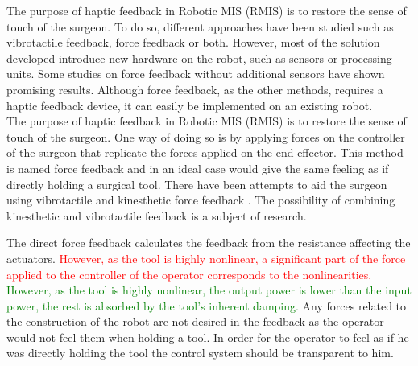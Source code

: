 {\color{green}
The purpose of haptic feedback in Robotic MIS (RMIS) is to restore the sense of touch of the surgeon. To do so, different approaches have been studied such as vibrotactile feedback\cite{tactile1}\cite{tactile2}, force feedback\cite{force_feedback_surgery} or both\cite{tactile3}. However, most of the solution developed introduce new hardware on the robot, such as sensors or processing units. Some studies on force feedback without additional sensors have shown promising results\cite{tactile_summary}. Although force feedback, as the other methods, requires a haptic feedback device, it can easily be implemented on an existing robot. 
}
\\
{\color{purple}
The purpose of haptic feedback in Robotic MIS (RMIS) is to restore the sense of touch of the surgeon. One way of doing so is by applying forces on the controller of the surgeon that replicate the forces applied on the end-effector. This method is named force feedback and in an ideal case would give the same feeling as if directly holding a surgical tool. There have been attempts to aid the surgeon using vibrotactile\cite{tactile1}\cite{tactile2} and kinesthetic force feedback \cite{force_feedback_surgery}\cite{tactile_summary}. The possibility of combining kinesthetic and vibrotactile feedback is a subject of research\cite{tactile3}.}

 The direct force feedback calculates the feedback from the resistance affecting the actuators. \textcolor{red}{However, as the tool is highly nonlinear, a significant part of the force applied to the controller of the operator corresponds to the nonlinearities.}
\textcolor{green}{However, as the tool is highly nonlinear, the output power is lower than the input power, the rest is absorbed by the tool's inherent damping.}
 Any forces related to the construction of the robot are not desired in the feedback as the operator would not feel them when holding a tool. In order for the operator to feel as if he was directly holding the tool the control system should be transparent to him.



